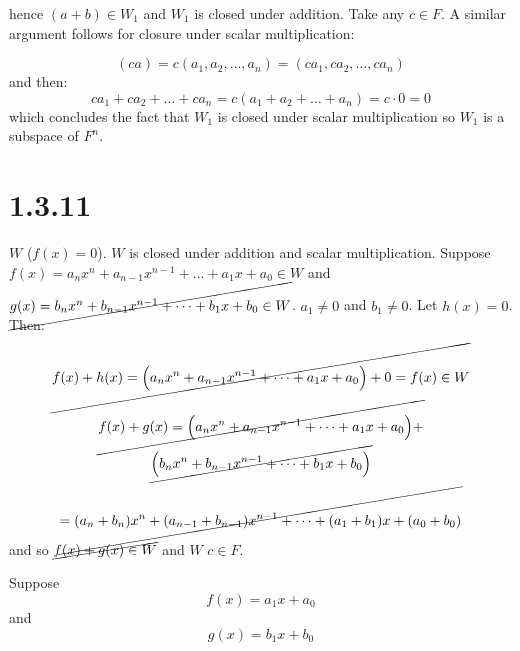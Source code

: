 \documentclass{article}
\begin{document}
hence \((a + b) \in W_{1}\) and \(W_{1}\) is closed under addition. Take any \(c \in F\). A similar argument follows for 
closure under scalar multiplication:

\begin{equation*}
    (ca) = c(a_{1}, a_{2}, \dots, a_{n}) = (ca_{1}, ca_{2}, \dots, ca_{n})
\end{equation*}
and then:
\begin{equation*}
    ca_{1} + ca_{2} + \dots + ca_{n} = c(a_{1} + a_{2} + \dots + a_{n}) = c \cdot 0 = 0
\end{equation*}
which concludes the fact that \(W_{1}\) is closed under scalar multiplication so \(W_{1}\) is a subspace of \(F^{n}\). 


\section*{1.3.11}

\(W\)  (\(f(x) = 0\)).  \(W\) is closed under addition and scalar multiplication.
Suppose \(f(x) = a_{n}x^{n} + a_{n-1}x^{n-1} + \dots + a_{1}x + a_{0} \in W\) and \(\cancel{g(x) = b_{n}x^{n} + b_{n-1}x^{n-1} + \dots + b_{1}x + b_{0} \in W}\).
 \(a_{1} \neq 0\) and \(b_{1} \neq 0 \).
Let \(h(x) = 0\). Then:
\begin{equation*}
    \cancel{f(x) + h(x) = \Big(a_{n}x^{n} + a_{n-1}x^{n-1} + \dots + a_{1}x + a_{0}\Big) + 0 = f(x) \in W}
\end{equation*}
\begin{multline*}
    \cancel{f(x) + g(x) = \Big( a_{n}x^{n} + a_{n-1}x^{n-1} + \dots + a_{1}x + a_{0} \Big) +} \\ \cancel{\Big( b_{n}x^{n} + b_{n-1}x^{n-1} + \dots + b_{1}x + b_{0} \Big)}
\end{multline*}
\begin{equation*}
    \cancel{= (a_{n} + b_{n})x^{n} + (a_{n-1} + b_{n-1})x^{n-1} + \dots + (a_{1} + b_{1})x + (a_{0} + b_{0})}
\end{equation*}
and so \(\cancel{f(x) + g(x) \in W}\) and \(W\)  \(c \in F\).

\vspace{5mm}
Suppose
\begin{equation*}
    f(x) = a_{1}x + a_{0}
\end{equation*}
and
\begin{equation*}
    g(x) = b_{1}x + b_{0}
\end{equation*}
\end{document}
